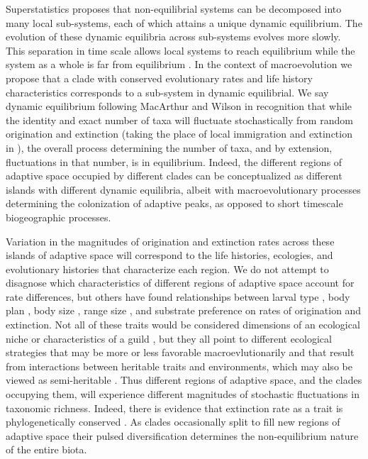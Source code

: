\documentclass[12pt]{article}
\let\citep=\cite
\begin{document}
Superstatistics \citep{beck2003} proposes that non-equilibrial systems
can be decomposed into many local sub-systems, each of which attains a
unique dynamic equilibrium. The evolution of these dynamic equilibria
across sub-systems evolves more slowly. This separation in time scale
allows local systems to reach equilibrium while the system as a whole
is far from equilibrium \citep{beck2003}. In the context of
macroevolution we propose that a clade with conserved evolutionary
rates and life history characteristics corresponds to a sub-system in
dynamic equilibrial.  We say dynamic equilibrium following MacArthur
and Wilson \citep{macWilson} in recognition that while the identity
and exact number of taxa will fluctuate stochastically from random
origination and extinction (taking the place of local immigration and
extinction in \citep{macWilson}), the overall process determining the
number of taxa, and by extension, fluctuations in that number, is in
equilibrium. Indeed, the different regions of adaptive space occupied
by different clades can be conceptualized as different islands with
different dynamic equilibria, albeit with macroevolutionary processes
determining the colonization of adaptive peaks, as opposed to short
timescale biogeographic processes.

Variation in the magnitudes of origination and extinction rates across
these islands of adaptive space will correspond to the life histories,
ecologies, and evolutionary histories that characterize each
region. We do not attempt to disagnose which characteristics of
different regions of adaptive space account for rate differences, but
others have found relationships between larval type
\citep{jablonski2008}, body plan \citep{erwin2012}, body size
\citep{harnik2011}, range size \citep{harnik2011, foote2008paleobiol},
and substrate preference \citep{hopkins2014} on rates of origination
and extinction. Not all of these traits would be considered dimensions
of an ecological niche or characteristics of a guild \citep{bambach},
but they all point to different ecological strategies that may be more
or less favorable macroevlutionarily and that result from interactions
between heritable traits and environments, which may also be viewed as
semi-heritable \citep{nicheCons}. Thus different regions of adaptive
space, and the clades occupying them, will experience different
magnitudes of stochastic fluctuations in taxonomic richness. Indeed,
there is evidence that extinction rate as a trait is phylogenetically
conserved \citep{rabosky2009heritability}. As clades occasionally
split to fill new regions of adaptive space their pulsed
diversification determines the non-equilibrium nature of the entire
biota.
\end{document}
